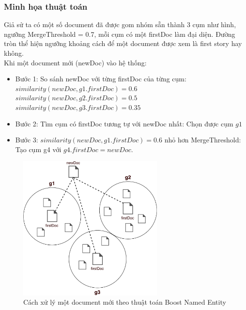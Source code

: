 	\subsubsection{Minh họa thuật toán}
	Giả sử ta có một số document đã được gom nhóm sẵn thành 3 cụm như hình, ngưỡng MergeThreshold = 0.7, mỗi cụm có một firstDoc làm đại diện. Đường tròn thể hiện ngưỡng khoảng cách để một document được xem là first story hay không.\\
	
	Khi một document mới (newDoc) vào hệ thống: 
	\begin{itemize}
		\item Bước 1: So sánh newDoc với từng firstDoc của từng cụm:\\ 
		$similarity(newDoc, g1.firstDoc) = 0.6$\\
		$similarity(newDoc, g2.firstDoc) = 0.5$\\
		$similarity(newDoc, g3.firstDoc) = 0.35$%
		\item Bước 2: Tìm cụm có firstDoc tương tự với newDoc nhất: Chọn được cụm $g1$%
		\item Bước 3: $similarity(newDoc, g1.firstDoc) = 0.6$ nhỏ hơn MergeThreshold: Tạo cụm g4 với $g4.firstDoc = newDoc$.
	\end{itemize}
	
	\begin{figure}[ht]
		\begin{center}
			\includegraphics[width=0.65\textwidth]{Clustering_NER2.pdf}
			\caption{Cách xử lý một document mới theo thuật toán Boost Named Entity}
		\end{center}
	\end{figure}
	
